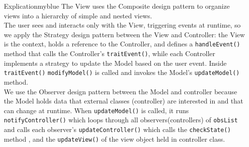 \vspace{0.25cm}
\begin{prettyBox}{Explication}{myblue}
The View uses the Composite design pattern to organize views into a hierarchy of simple and nested views.\\[0.15cm]
The user sees and interacts only with the View, triggering events at runtime, so we apply the Strategy design
pattern between the View and Controller: the View is the context, holds a reference to the Controller, and defines
a \texttt{handleEvent()} method that calls the Controller’s \texttt{traitEvent()}, while each Controller implements
a strategy to update the Model based on the user event. Inside \texttt{traitEvent()} \texttt{modifyModel()} is called and invokes
the Model’s \texttt{updateModel()} method.\\[0.15cm]
We use the Observer design pattern between the Model and controller because the Model holds data that external classes
(controller) are interested in and that can change at runtime. When \texttt{updateModel()} is called, it runs \texttt{notifyController()} 
which loops through all observers(controllers) of \texttt{obsList} and calls each observer’s \texttt{updateController()} which calls 
the \texttt{checkState()} method , and the \texttt{updateView()} of the view object held in controller class.
\end{prettyBox}


